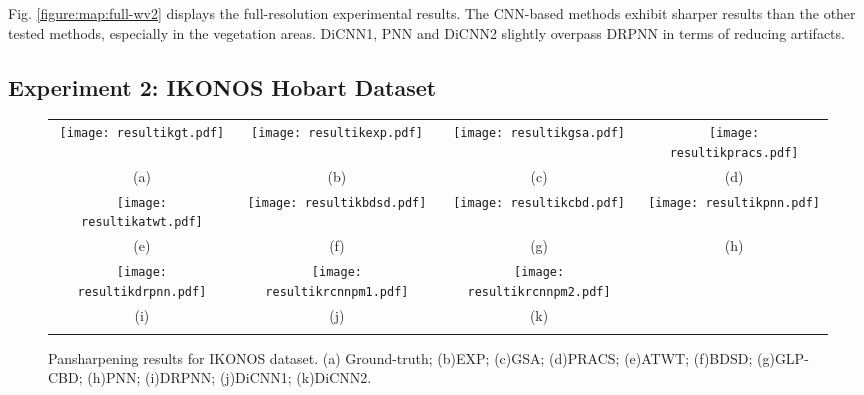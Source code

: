 \documentclass[journal]{IEEEtran}
\begin{document}
Fig. \ref{figure:map:full-wv2} displays the full-resolution experimental results. The CNN-based methods exhibit sharper results than the other tested methods, especially in the vegetation areas. DiCNN1, PNN and DiCNN2 slightly overpass DRPNN in terms of reducing artifacts.


\subsection{Experiment 2: IKONOS Hobart Dataset}

\begin{figure*}[t]\scriptsize
\centering
  \begin{tabular}{cccc}
\texttt{[image: resultikgt.pdf]} &
\texttt{[image: resultikexp.pdf]} &
\texttt{[image: resultikgsa.pdf]} &
\texttt{[image: resultikpracs.pdf]} \\
(a) & (b) & (c)  & (d)  \\

\texttt{[image: resultikatwt.pdf]} &
\texttt{[image: resultikbdsd.pdf]} &
\texttt{[image: resultikcbd.pdf]} &
\texttt{[image: resultikpnn.pdf]} \\
(e) &(f) &(g) & (h) \\

\texttt{[image: resultikdrpnn.pdf]} &
\texttt{[image: resultikrcnnpm1.pdf]} &
\texttt{[image: resultikrcnnpm2.pdf]} \\
(i) &(j) &(k)  \\
\\
\end{tabular}
\caption{Pansharpening results for IKONOS dataset. (a) Ground-truth; (b)EXP; (c)GSA; (d)PRACS; (e)ATWT; (f)BDSD;  (g)GLP-CBD; (h)PNN; (i)DRPNN; (j)DiCNN1; (k)DiCNN2. }
\label{figure:map:ik}
\end{figure*}
\end{document}
